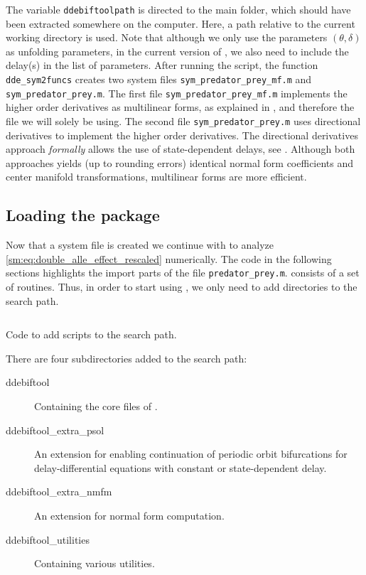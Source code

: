 \newcommand\pathToDDEBifToolDemos{/home/maikel/Documents/MySoftware/ddebiftool-git/demos/tutorials/VII}
\inputminted[firstline=18, lastline=50]{MATLAB}{\pathToDDEBifToolDemos/predator_prey/gen_sym_predator_prey.m}
The variable \texttt{ddebiftoolpath} is directed to the \DDEBIFTOOL main
folder, which should have been extracted somewhere on the computer. Here, a path
relative to the current working directory is used. Note that although we only
use the parameters $(\theta,\delta)$ as unfolding parameters, in the current
version of \DDEBIFTOOL, we also need to include the delay(s) in the list of
parameters. After running the script, the function \texttt{dde_sym2funcs}
creates two system files \texttt{sym_predator_prey_mf.m} and \texttt{sym_predator_prey.m}.
The first file \texttt{sym_predator_prey_mf.m} implements the higher order derivatives
as multilinear forms, as explained in \cite[Section 6]{Switching2019}, and therefore the
file we will solely be using. The second file \texttt{sym_predator_prey.m}
uses directional derivatives to implement the higher order derivatives. The
directional derivatives approach \emph{formally} allows the use of
state-dependent delays, see \cite{Sieber@2017}. Although both approaches yields
(up to rounding errors) identical normal form coefficients and center manifold
transformations, multilinear forms are more efficient.

\subsection{Loading the \DDEBIFTOOL package}
\label{sm:sec:loading_DDE-BIFTool}
Now that a system file is created we continue with \DDEBIFTOOL to analyze
\cref{sm:eq:double_alle_effect_rescaled} numerically. The code in the following
sections highlights the import parts of the file \texttt{predator_prey.m}.
\DDEBIFTOOL consists of a set of \MATLAB routines. Thus, in order to start
using \DDEBIFTOOL, we only need to add \DDEBIFTOOL directories to the search
path.
\begin{listing}[H]
\inputminted[firstline=17, lastline=25]{MATLAB}{\pathToDDEBifToolDemos/predator_prey/predator_prey.m}
\caption{Code to add \DDEBIFTOOL scripts to the search path.}
\label{sm:lst:searchpath}
\end{listing}
There are four subdirectories added to the search path:
\par
\medskip
\begin{description}
\item[ddebiftool] Containing the core files of \DDEBIFTOOL.
\item[ddebiftool\_extra\_psol] An extension for enabling continuation of periodic orbit bifurcations for delay-differential equations with constant or state-dependent delay.
\item[ddebiftool\_extra\_nmfm] An extension for normal form computation.
\item[ddebiftool\_utilities] Containing various utilities.
\end{description}

